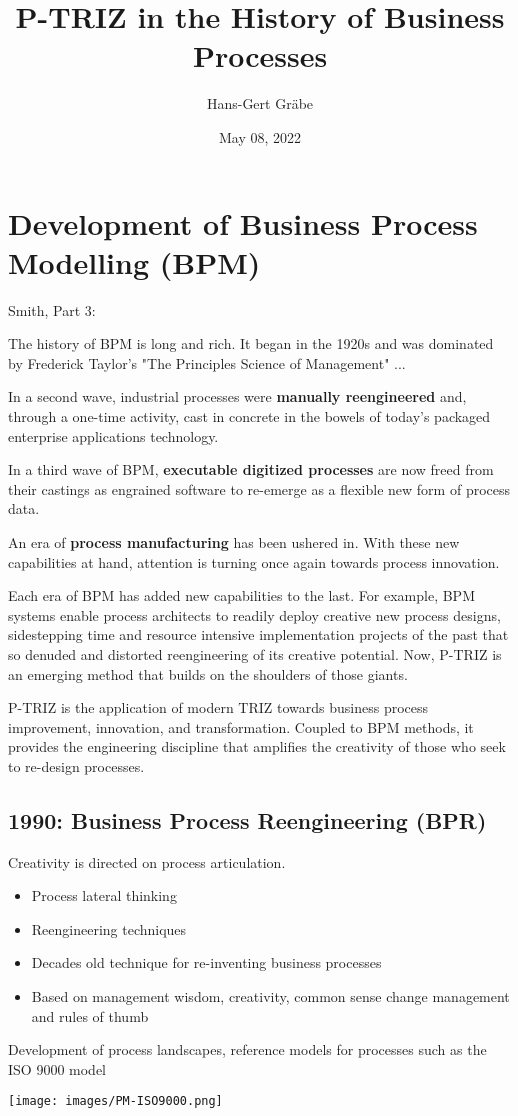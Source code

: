 \documentclass[11pt,a4paper]{article}
\title{P-TRIZ in the History of Business Processes}
\author{Hans-Gert Gr\"abe}
\date{May 08, 2022}
\begin{document}
\maketitle

\section{Development of Business Process Modelling (BPM)}

Smith, Part 3:

The history of BPM is long and rich. It began in the 1920s and was dominated
by Frederick Taylor’s "The Principles Science of Management" ...

In a second wave, industrial processes were \textbf{manually reengineered}
and, through a one-time activity, cast in concrete in the bowels of today’s
packaged enterprise applications technology.

In a third wave of BPM, \textbf{executable digitized processes} are now freed
from their castings as engrained software to re-emerge as a flexible new form
of process data.

An era of \textbf{process manufacturing} has been ushered in. With these new
capabilities at hand, attention is turning once again towards process
innovation.

Each era of BPM has added new capabilities to the last. For example, BPM
systems enable process architects to readily deploy creative new process
designs, sidestepping time and resource intensive implementation projects of
the past that so denuded and distorted reengineering of its creative
potential. Now, P-TRIZ is an emerging method that builds on the shoulders of
those giants.

P-TRIZ is the application of modern TRIZ towards business process improvement,
innovation, and transformation. Coupled to BPM methods, it provides the
engineering discipline that amplifies the creativity of those who seek to
re-design processes.

\subsection{1990: Business Process Reengineering (BPR)}
Creativity is directed on process articulation. 
\begin{itemize}
\item Process lateral thinking
\item Reengineering techniques
\item Decades old technique for re-inventing business processes
\item Based on management wisdom, creativity, common sense change management
  and rules of thumb
\end{itemize}
Development of process landscapes, reference models for processes such as the
ISO 9000 model
\begin{center}
  \texttt{[image: images/PM-ISO9000.png]}
\end{center}
\end{document}
